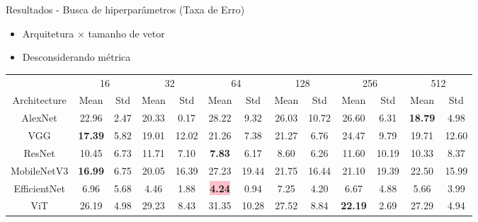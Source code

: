 \begin{frame}{Resultados - Busca de hiperparâmetros (Taxa de Erro)}
    \begin{itemize}
        \item Arquitetura $\times$ tamanho de vetor
        \item Desconsiderando métrica
    \end{itemize}
\begin{table}
\centering
\setlength{\tabcolsep}{3pt}
\begin{tabular}{ccc|cc|cc|cc|cc|cc}
& \multicolumn{2}{c}{16} & \multicolumn{2}{c}{32} & \multicolumn{2}{c}{64} & \multicolumn{2}{c}{128} & \multicolumn{2}{c}{256} & \multicolumn{2}{c}{512} \\
\cmidrule(lr){2-3} \cmidrule(lr){4-5} \cmidrule(lr){6-7} \cmidrule(lr){8-9} \cmidrule(lr){10-11} \cmidrule(lr){12-13}
Architecture & Mean & Std & Mean & Std & Mean & Std  & Mean & Std & Mean & Std & Mean & Std\\
\midrule
AlexNet         & 22.96 & 2.47 & 20.33 & 0.17  & 28.22 & 9.32  & 26.03 & 10.72 & 26.60 & 6.31  & \textbf{18.79} & 4.98 \\
VGG             & \textbf{17.39} & 5.82 & 19.01 & 12.02 & 21.26 & 7.38  & 21.27 & 6.76  & 24.47 & 9.79  & 19.71 & 12.60 \\
ResNet          & 10.45 & 6.73 & 11.71 & 7.10  & \textbf{7.83}  & 6.17  & 8.60  & 6.26  & 11.60 & 10.19 & 10.33 & 8.37 \\
MobileNetV3     & \textbf{16.99} & 6.75 & 20.05 & 16.39 & 27.23 & 19.44 & 21.75 & 16.44 & 21.10 & 19.39 & 22.50 & 15.99 \\
EfficientNet    & 6.96  & 5.68 & 4.46  & 1.88  & \colorbox{pink}{\textbf{4.24}}  & 0.94  & 7.25  & 4.20  & 6.67  & 4.88  & 5.66  & 3.99 \\
ViT             & 26.19 & 4.98 & 29.23 & 8.43  & 31.35 & 10.28 & 27.52 & 8.84  & \textbf{22.19} & 2.69  & 27.29 & 4.94 \\
\bottomrule
\end{tabular}
\end{table}
\end{frame}

